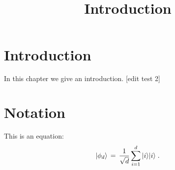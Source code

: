 

%


\title{Introduction}


\maketitle

\label{section-phantom}

\tableofcontents

\section{Introduction}
\label{section:introduction}

In this chapter we give an introduction. [edit test 2]

\section{Notation}
\label{section-notation}

This is an equation:
\begin{equation}
\label{eq:me-state}
 |\phi_d\rangle \,=\,\frac{1}{\sqrt{d}} \sum_{i=1}^d |i\rangle|i\rangle\;.
\end{equation}








